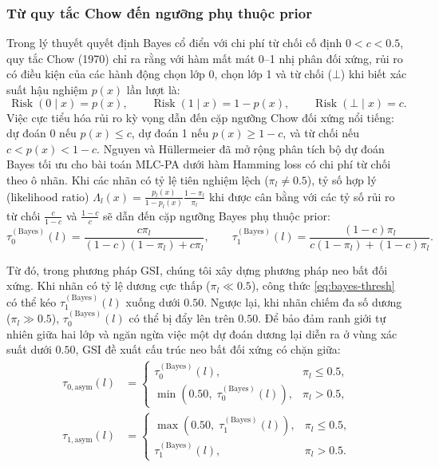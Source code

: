 \documentclass[11pt,a4paper]{article}
\begin{document}
\subsubsection{Từ quy tắc Chow đến ngưỡng phụ thuộc prior}
Trong lý thuyết quyết định Bayes cổ điển với chi phí từ chối cố định \(0 < c < 0.5\), quy tắc Chow (1970) \cite{chow1970} chỉ ra rằng với hàm mất mát 0--1 nhị phân đối xứng, rủi ro có điều kiện của các hành động chọn lớp 0, chọn lớp 1 và từ chối (\(\bot\)) khi biết xác suất hậu nghiệm \(p(x)\) lần lượt là:
\begin{equation}
\operatorname{Risk}(0\mid x) = p(x), \qquad \operatorname{Risk}(1\mid x) = 1 - p(x), \qquad \operatorname{Risk}(\bot\mid x) = c.
\label{eq:chow-risks}
\end{equation}
Việc cực tiểu hóa rủi ro kỳ vọng dẫn đến cặp ngưỡng Chow đối xứng nổi tiếng: dự đoán 0 nếu \(p(x) \le c\), dự đoán 1 nếu \(p(x) \ge 1-c\), và từ chối nếu \(c < p(x) < 1-c\). Nguyen và Hüllermeier \cite{nguyen2020,nguyen2021} đã mở rộng phân tích bộ dự đoán Bayes tối ưu cho bài toán MLC-PA dưới hàm Hamming loss có chi phí từ chối theo ô nhãn. Khi các nhãn có tỷ lệ tiên nghiệm lệch (\(\pi_l \ne 0.5\)), tỷ số hợp lý (likelihood ratio) \(\Lambda_l(x) = \frac{p_l(x)}{1-p_l(x)} \frac{1-\pi_l}{\pi_l}\) khi được cân bằng với các tỷ số rủi ro từ chối \(\frac{c}{1-c}\) và \(\frac{1-c}{c}\) sẽ dẫn đến cặp ngưỡng Bayes phụ thuộc prior:
\begin{equation}
\tau_0^{(\mathrm{Bayes})}(l) = \frac{c\pi_l}{(1-c)(1-\pi_l)+c\pi_l}, \qquad \tau_1^{(\mathrm{Bayes})}(l) = \frac{(1-c)\pi_l}{c(1-\pi_l)+(1-c)\pi_l}.
\label{eq:bayes-thresh}
\end{equation}

Từ đó, trong phương pháp GSI, chúng tôi xây dựng phương pháp neo bất đối xứng. Khi nhãn có tỷ lệ dương cực thấp (\(\pi_l \ll 0.5\)), công thức \eqref{eq:bayes-thresh} có thể kéo \(\tau_1^{(\mathrm{Bayes})}(l)\) xuống dưới \(0.50\). Ngược lại, khi nhãn chiếm đa số dương (\(\pi_l \gg 0.5\)), \(\tau_0^{(\mathrm{Bayes})}(l)\) có thể bị đẩy lên trên \(0.50\). Để bảo đảm ranh giới tự nhiên giữa hai lớp và ngăn ngừa việc một dự đoán dương lại diễn ra ở vùng xác suất dưới \(0.50\), GSI đề xuất cấu trúc neo bất đối xứng có chặn giữa:
\begin{align}
\tau_{0,\mathrm{asym}}(l) &=
\begin{cases}
\tau_0^{(\mathrm{Bayes})}(l), & \pi_l \le 0.5, \\
\min\left(0.50, \; \tau_0^{(\mathrm{Bayes})}(l)\right), & \pi_l > 0.5,
\end{cases} \label{eq:asym-0} \\
\tau_{1,\mathrm{asym}}(l) &=
\begin{cases}
\max\left(0.50, \; \tau_1^{(\mathrm{Bayes})}(l)\right), & \pi_l \le 0.5, \\
\tau_1^{(\mathrm{Bayes})}(l), & \pi_l > 0.5.
\end{cases} \label{eq:asym-1}
\end{align} 
\end{document}
